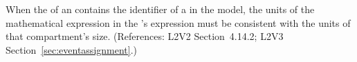 When the   of an \EventAssignment
contains the identifier of a \Compartment in the model, the
units of the mathematical expression in the
\EventAssignment's  expression must be
consistent with the units of that compartment's size.
(References: L2V2 Section~4.14.2; L2V3 Section~\ref{sec:eventassignment}.)

